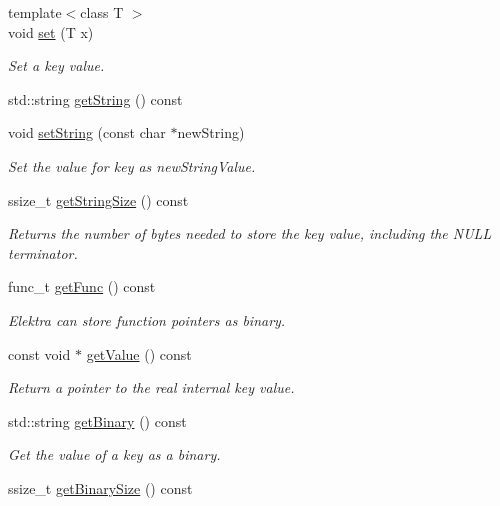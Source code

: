 \begin{DoxyCompactItemize}
{\footnotesize template$<$class T $>$ }\\void \mbox{\hyperlink{classkdb_1_1Key_a615124f0a2b291e03975b49c233654d7}{set}} (T x)
\begin{DoxyCompactList}\small\item\em Set a key value. \end{DoxyCompactList}\item 
std\+::string \mbox{\hyperlink{classkdb_1_1Key_af612ede3a73e57b317a65e40e7f9e01b}{get\+String}} () const
\item 
void \mbox{\hyperlink{classkdb_1_1Key_a18df1f7a447b999fae5faf32fc1ab893}{set\+String}} (const char $\ast$new\+String)
\begin{DoxyCompactList}\small\item\em Set the value for {\ttfamily key} as {\ttfamily new\+String\+Value}. \end{DoxyCompactList}\item 
ssize\+\_\+t \mbox{\hyperlink{classkdb_1_1Key_a4cfc9941a93a94b306b8264d0d21abc2}{get\+String\+Size}} () const
\begin{DoxyCompactList}\small\item\em Returns the number of bytes needed to store the key value, including the N\+U\+LL terminator. \end{DoxyCompactList}\item 
func\+\_\+t \mbox{\hyperlink{classkdb_1_1Key_aa9643866a567ba5f012a3e9ab2a91721}{get\+Func}} () const
\begin{DoxyCompactList}\small\item\em Elektra can store function pointers as binary. \end{DoxyCompactList}\item 
const void $\ast$ \mbox{\hyperlink{classkdb_1_1Key_a444c6f254536196a7031288e9f4c3088}{get\+Value}} () const
\begin{DoxyCompactList}\small\item\em Return a pointer to the real internal {\ttfamily key} value. \end{DoxyCompactList}\item 
std\+::string \mbox{\hyperlink{classkdb_1_1Key_ada114aba31b321ddc984018b43a8568b}{get\+Binary}} () const
\begin{DoxyCompactList}\small\item\em Get the value of a key as a binary. \end{DoxyCompactList}\item 
ssize\+\_\+t \mbox{\hyperlink{classkdb_1_1Key_af33a66e7b35c0ec6f9a65105257f21aa}{get\+Binary\+Size}} () const

\end{DoxyCompactItemize}
